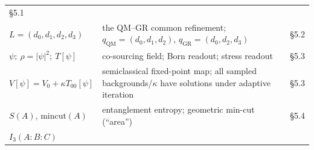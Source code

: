 \begin{longtable}[]{@{}lll@{}}
\begin{minipage}[t]{0.17\columnwidth}
§5.1\strut
\end{minipage}\tabularnewline
\begin{minipage}[t]{0.27\columnwidth}\raggedright
\(L = (d_0,d_1,d_2,d_3)\)\strut
\end{minipage} & \begin{minipage}[t]{0.49\columnwidth}\raggedright
the QM--GR common refinement; \(q_{\mathrm{QM}}=(d_0,d_1,d_2)\), \(q_{\mathrm{GR}}=(d_0,d_2,d_3)\)\strut
\end{minipage} & \begin{minipage}[t]{0.17\columnwidth}\raggedright
§5.2\strut
\end{minipage}\tabularnewline
\begin{minipage}[t]{0.27\columnwidth}\raggedright
\(\psi;\ \rho=|\psi|^2;\ T[\psi]\)\strut
\end{minipage} & \begin{minipage}[t]{0.49\columnwidth}\raggedright
co-sourcing field; Born readout; stress readout\strut
\end{minipage} & \begin{minipage}[t]{0.17\columnwidth}\raggedright
§5.3\strut
\end{minipage}\tabularnewline
\begin{minipage}[t]{0.27\columnwidth}\raggedright
\(V[\psi] = V_0 + \kappa T_{00}[\psi]\)\strut
\end{minipage} & \begin{minipage}[t]{0.49\columnwidth}\raggedright
semiclassical fixed-point map; all sampled backgrounds/\(\kappa\) have solutions under adaptive iteration\strut
\end{minipage} & \begin{minipage}[t]{0.17\columnwidth}\raggedright
§5.3\strut
\end{minipage}\tabularnewline
\begin{minipage}[t]{0.27\columnwidth}\raggedright
\(S(A)\), \(\mathrm{mincut}(A)\)\strut
\end{minipage} & \begin{minipage}[t]{0.49\columnwidth}\raggedright
entanglement entropy; geometric min-cut (``area'')\strut
\end{minipage} & \begin{minipage}[t]{0.17\columnwidth}\raggedright
§5.4\strut
\end{minipage}\tabularnewline
\begin{minipage}[t]{0.27\columnwidth}\raggedright
\(I_3(A{:}B{:}C)\)\strut
\end{minipage} & \begin{minipage}[t]{0.49\columnwidth}\raggedright

\end{minipage}
\end{longtable}

